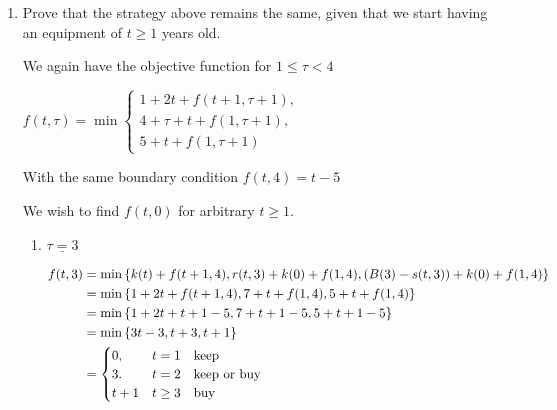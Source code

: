 \begin{prob}
\begin{enumerate}[label = {\textbf{(\greek*)}}]
\begin{sol}
\begin{enumerate}[start = 1, label = {\protect\tsc{$\mathbf{S_{\arabic*}}$}}]
$\underline{\tau=0}$ goal at $t=2$ year old equipment we start with

$\begin{aligned}
f(2,0) &= \min\cbr{k(2)+f(3,1),r(2,0)+k(0)+f(1,1),\rbr{B(1)-s(2,0)}+k(0)+f(1,1)}\\
&= \min\cbr{5+14,5+1+10,5+1+1+10}=16 &\text{replace}
\end{aligned}$

\item Decision: Policy
\begin{enumerate}[start = 0, label = {$\tau=\arabic*:$}]
    \item replace\quad $\to (1,1)$
    \item keep\quad $\to (2,2)$
    \item buy\quad $\to (1,3)$
    \item keep\quad sell next year
\end{enumerate}

\end{enumerate}
    \end{sol}
    \item Prove that the strategy above remains the same, given that we start having an equipment of $t \geq 1$ years old.
    
    \begin{sol}
    
    We again have the objective function for $1\leq\tau<4$
    
    $f(t,\tau) = \min\begin{cases} 
1+2t+f(t+1,\tau+1), \\
4+\tau+t+f(1,\tau+1), \\
5+t+f(1,\tau+1)
\end{cases}$

With the same boundary condition $f(t,4)=t-5$

We wish to find $f(t,0)$ for arbitrary $t\geq 1$.

\begin{enumerate}
 
\item $\underline{\tau=3}$ 

$\begin{aligned}
f(t,3) &= \min\left\{k(t)+f(t+1,4),r(t,3)+k(0)+f(1,4),\left(B(3)-s(t,3)\right)+k(0)+f(1,4)\right\}\\
&= \min\left\{1+2t+f(t+1,4),7+t+f(1,4),5+t+f(1,4)\right\} \\
&= \min\left\{1+2t+t+1-5,7+t+1-5,5+t+1-5\right\}\\
&= \min\left\{3t-3,t+3,t+1\right\}\\
&=\begin{cases}
0, & t=1 \quad \text{keep}\\
3. & t=2 \quad \text{keep or buy}\\
t+1 & t\geq3 \quad \text{buy}
\end{cases}
\end{aligned}$


\end{enumerate}
\end{sol}
\end{enumerate}
\end{prob}
